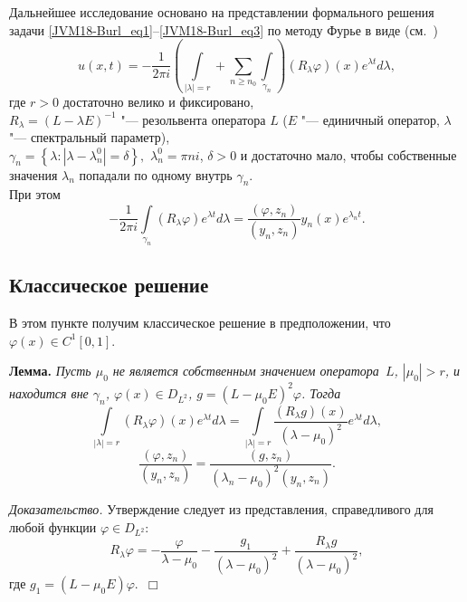 Дальнейшее исследование основано на представлении формального
решения задачи \eqref{JVM18-Burl_eq1}--\eqref{JVM18-Burl_eq3} по
методу Фурье   в виде (см.~\cite{burl-JVM19,Vagabov94})
\begin{equation}\label{Burl_eq5}
u(x,t)=-\frac{1}{2\pi i}\left( \int\limits_{|\lambda |=r}{{}}+
    \sum\limits_{n\geqslant {{n}_{0}}}{\int\limits_{{{\gamma }_{n}}}{{}}} \right)
    ({{R}_{\lambda }}\varphi )(x){{e}^{\lambda t}}d\lambda ,
\end{equation}
где $r>0$ достаточно велико и фиксировано, \\
${{R}_{\lambda }}={{(L-\lambda E)}^{-1}}$ "--- резольвента оператора
$L$  ($E$ "--- единичный оператор, $\lambda $ "--- спектральный
параметр), \\
${{\gamma }_{n}}=\left\{ \lambda : |\lambda -\lambda
_{n}^{0}|=\delta  \right\},$ $\lambda _{n}^{0}=\pi ni$, $\delta
>0$ и достаточно мало, чтобы собственные значения ${{\lambda }_{n}}$
попадали по одному внутрь ${{\gamma }_{n}}$. \\
При этом
$$-\frac{1}{2\pi i}\int\limits_{{{\gamma }_{n}}}{({{R}_{\lambda }}\varphi ){{e}^{\lambda t}}d\lambda  }=\frac{(\varphi
,{{z}_{n}})}{({{y}_{n}},{{z}_{n}})}{{y}_{n}}(x){{e}^{{{\lambda
}_{n}}t}}.$$




\subsection{Классическое решение}\label{Burl_sec3}



В этом пункте получим классическое решение в предположении, что
$\varphi (x)\in C^1[0,1]$.

{\bf Лемма. } {\it Пусть $\mu_0$ не является собственным значением
оператора~$L$, $|\mu_0|>r$, и находится вне $\gamma_n$, $\varphi
(x)\in {{D}_{{{L}^{2}}}}$,  $g=(L-\mu_0 E)^2\varphi$. Тогда
$$
  \int\limits_{|\lambda |=r}
        ({{R}_{\lambda }}\varphi )(x){{e}^{\lambda t}}d\lambda =
  \int\limits_{|\lambda |=r} \frac{(R_{\lambda}g) (x)}{(\lambda-\mu_0)^2}{{e}^{\lambda t}
  }d\lambda,
$$
$$
 \frac{(\varphi ,{{z}_{n}})}{({{y}_{n}},{{z}_{n}})}=
 \frac{(g ,{{z}_{n}})}{(\lambda_n-\mu_0)^2({{y}_{n}},{{z}_{n}})}.
$$
 }

\textsl{ Доказательство.}  Утверждение следует из представления,
справедливого для любой функции $\varphi\in D_{L^2}$:
$$ R_{\lambda}\varphi = - \frac{\varphi}{\lambda-\mu_0} -\frac{g_1}{(\lambda-\mu_0)^2}
+\frac{R_{\lambda}g}{(\lambda-\mu_0)^2}, $$ где
 $g_1=(L-\mu_0 E)\varphi$.~$\Box$



